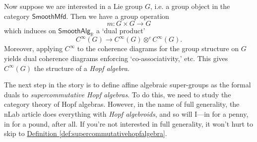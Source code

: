 \documentclass[a4paper,10pt]{scrreprt}
\newcommand{\R}{\mathbb{R}}
\theoremstyle{definition}
\theoremstyle{plain}
\theoremstyle{remark}
\begin{document}
Now suppose we are interested in a Lie group $G$, i.e. a group object in the category $\mathsf{SmoothMfd}$. Then we have a group operation 
\begin{equation*}
  m\colon G \times G \to G
\end{equation*}
which induces on $\mathsf{SmoothAlg}_{\R}$ a `dual product' 
\begin{equation*}
  C^{\infty}(G) \to C^{\infty} (G) \otimes^{c} C^{\infty}(G).
\end{equation*}
Moreover, applying $C^{\infty}$ to the coherence diagrams for the group structure on $G$ yields dual coherence diagrams enforcing `co-associativity,' etc. This gives $C^{\infty}(G)$ the structure of a \emph{Hopf algebra}.

The next step in the story is to define affine algebraic super-groups as the formal duals to \emph{supercommutative Hopf algebras}. To do this, we need to study the category theory of Hopf algebras. However, in the name of full generality, the nLab article \cite{nlab-deligne-theorem} does everything with \emph{Hopf algebroids}, and so will I---in for a penny, in for a pound, after all. If you're not interested in full generality, it won't hurt to skip to \hyperref[def:supercommutativehopfalgebra]{Definition \ref*{def:supercommutativehopfalgebra}}.
\end{document}
